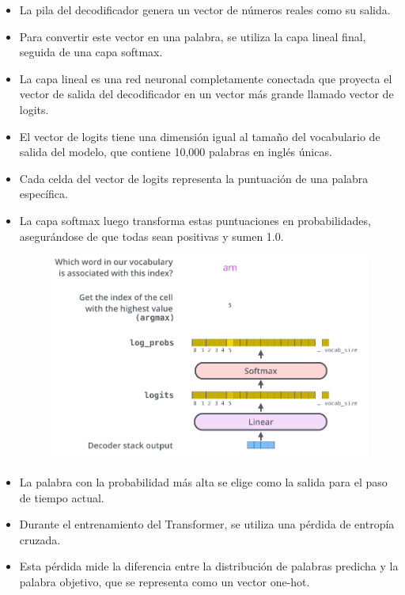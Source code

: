 \begin{itemize}
\item La pila del decodificador genera un vector de números reales como su salida.

\item Para convertir este vector en una palabra, se utiliza la capa lineal final, seguida de una capa softmax.

\item La capa lineal es una red neuronal completamente conectada que proyecta el vector de salida del decodificador en un vector más grande llamado vector de logits.

\item El vector de logits tiene una dimensión igual al tamaño del vocabulario de salida del modelo, que contiene 10,000 palabras en inglés únicas.

\item Cada celda del vector de logits representa la puntuación de una palabra específica.

\item La capa softmax luego transforma estas puntuaciones en probabilidades, asegurándose de que todas sean positivas y sumen 1.0.

\begin{figure}[h]
  \centering
  \includegraphics[scale=0.2]{pics/transformer_decoder_output_softmax.png}
\end{figure}

\item La palabra con la probabilidad más alta se elige como la salida para el paso de tiempo actual.

\item Durante el entrenamiento del Transformer, se utiliza una pérdida de entropía cruzada.

\item Esta pérdida mide la diferencia entre la distribución de palabras predicha y la palabra objetivo, que se representa como un vector one-hot.

\end{itemize}

